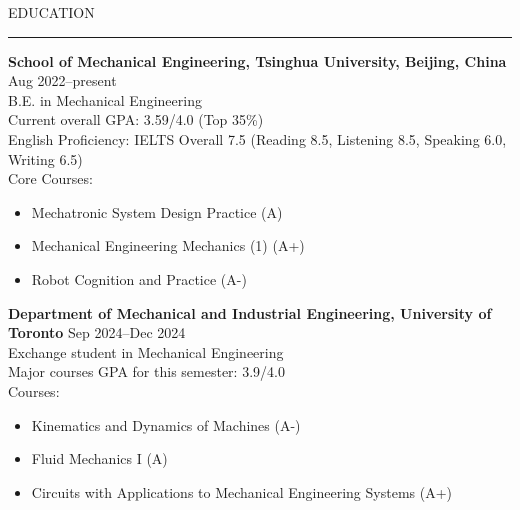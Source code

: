\documentclass{resume} %
\renewenvironment{rSection}[1]{
\sectionskip
\textcolor{TsinghuaPurple}{\MakeUppercase{#1}}
\sectionlineskip
\hrule
\begin{list}{}{
\setlength{\leftmargin}{0em}
}
\item[]
}{
\end{list}
}
\begin{document}
  


\begin{rSection}{Education}

{\bf School of Mechanical Engineering, Tsinghua University, Beijing, China } \hfill {Aug 2022--present}
\\ 
B.E. in Mechanical Engineering
\\
Current overall GPA\@: 3.59/4.0 (Top 35\%)
\\
English Proficiency: IELTS Overall 7.5 (Reading 8.5, Listening 8.5, Speaking 6.0, Writing 6.5)
\\
Core Courses: 
\begin{itemize}[itemsep = -0.5em, topsep = -0.5em]
    \item Mechatronic System Design Practice (A)
    \item Mechanical Engineering Mechanics (1) (A+)
    \item Robot Cognition and Practice (A-)
\end{itemize}

\vspace{11pt}

{\bf Department of Mechanical and Industrial Engineering, University of Toronto} \hfill {Sep 2024--Dec 2024}
\\ 
Exchange student in Mechanical Engineering
\\
Major courses GPA for this semester: 3.9/4.0
\\
Courses: 
\begin{itemize}[itemsep = -0.5em, topsep = -0.5em]
    \item Kinematics and Dynamics of Machines (A-)
    \item Fluid Mechanics I (A)
    \item Circuits with Applications to Mechanical Engineering Systems (A+)
\end{itemize}

\end{rSection} 
\end{document}
